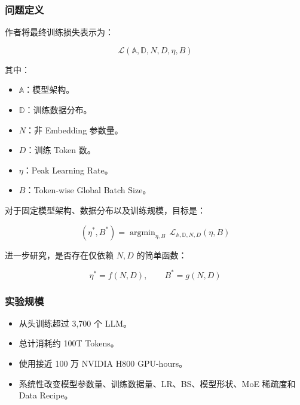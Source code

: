 \documentclass[
  11pt,
  a4paper,
  fontset=none]{ctexart}
\providecommand{\tightlist}{%
  \setlength{\itemsep}{0pt}\setlength{\parskip}{0pt}}
\newenvironment{NotesFormula}{%
  \par\noindent\begin{minipage}{\linewidth}%
  \setlength{\parindent}{2em}%
  \setlength{\parskip}{0.35em}%
}{\end{minipage}\par}
\begin{document}
\subsubsection{问题定义}\label{ux95eeux9898ux5b9aux4e49}

\begin{NotesFormula}

作者将最终训练损失表示为：

\[\mathcal L(\mathbb A,\mathbb D,N,D,\eta,B)\]

\end{NotesFormula}

其中：

\begin{itemize}
\tightlist
\item
  \(\mathbb A\)：模型架构。
\item
  \(\mathbb D\)：训练数据分布。
\item
  \(N\)：非 Embedding 参数量。
\item
  \(D\)：训练 Token 数。
\item
  \(\eta\)：Peak Learning Rate。
\item
  \(B\)：Token-wise Global Batch Size。
\end{itemize}

\begin{NotesFormula}

对于固定模型架构、数据分布以及训练规模，目标是：

\[(\eta^*,B^*)=\mathop{\arg\min}_{\eta,B}\,\mathcal L_{\mathbb A,\mathbb D,N,D}(\eta,B)\]

\end{NotesFormula}

\begin{NotesFormula}

进一步研究，是否存在仅依赖 \(N,D\) 的简单函数：

\[\boxed{\eta^*=f(N,D),\qquad B^*=g(N,D)}\]

\end{NotesFormula}

\subsubsection{实验规模}\label{ux5b9eux9a8cux89c4ux6a21}

\begin{itemize}
\tightlist
\item
  从头训练超过 3,700 个 LLM。
\item
  总计消耗约 100T Tokens。
\item
  使用接近 100 万 NVIDIA H800 GPU-hours。
\item
  系统性改变模型参数量、训练数据量、LR、BS、模型形状、MoE 稀疏度和 Data
  Recipe。
\end{itemize}
\end{document}
